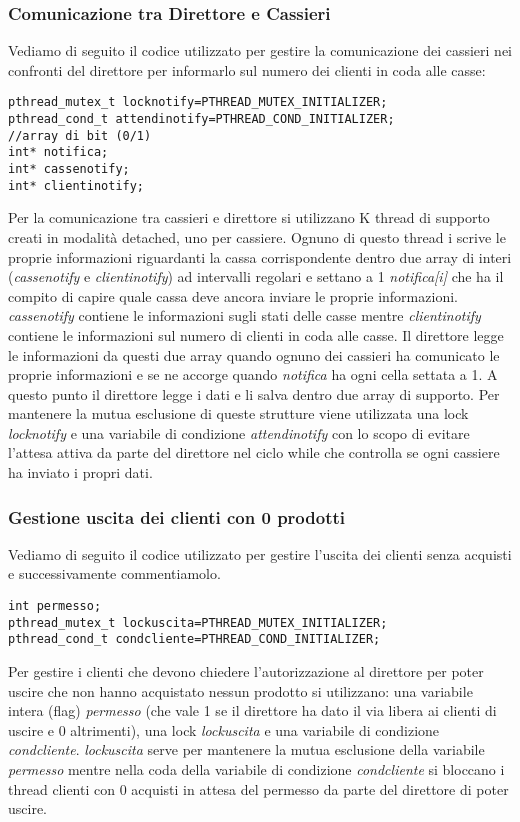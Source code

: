 \documentclass{article} %
\begin{document}
\subsubsection{Comunicazione tra Direttore e Cassieri}
Vediamo di seguito il codice utilizzato per gestire la comunicazione dei cassieri nei confronti del direttore per informarlo sul numero dei clienti in coda alle casse:
\begin{lstlisting}
pthread_mutex_t locknotify=PTHREAD_MUTEX_INITIALIZER;
pthread_cond_t attendinotify=PTHREAD_COND_INITIALIZER; 
//array di bit (0/1)
int* notifica;  
int* cassenotify; 
int* clientinotify; 
\end{lstlisting}
Per la comunicazione tra cassieri e direttore si utilizzano K thread di supporto creati in modalità detached, uno per cassiere. Ognuno di questo thread i scrive le proprie informazioni riguardanti la cassa corrispondente dentro due array di interi ({\itshape cassenotify} e {\itshape clientinotify}) ad intervalli regolari e settano a 1 {\itshape notifica[i]} che ha il compito di capire quale cassa deve ancora inviare le proprie informazioni. {\itshape cassenotify} contiene le informazioni sugli stati delle casse mentre {\itshape clientinotify} contiene le informazioni sul numero di clienti in coda alle casse. Il direttore legge le informazioni da questi due array quando ognuno dei cassieri ha comunicato le proprie informazioni e se ne accorge quando {\itshape notifica} ha ogni cella settata a 1. A questo punto il direttore legge i dati e li salva dentro due array di supporto. Per mantenere la mutua esclusione di queste strutture viene utilizzata una lock {\itshape locknotify} e una variabile di condizione {\itshape attendinotify} con lo scopo di evitare l’attesa attiva da parte del direttore nel ciclo while che controlla se ogni cassiere ha inviato i propri dati. 
\subsubsection{Gestione uscita dei clienti con 0 prodotti}
Vediamo di seguito il codice utilizzato per gestire l'uscita dei clienti senza acquisti e successivamente commentiamolo.
\begin{lstlisting}
int permesso; 
pthread_mutex_t lockuscita=PTHREAD_MUTEX_INITIALIZER; 
pthread_cond_t condcliente=PTHREAD_COND_INITIALIZER; 
\end{lstlisting}
Per gestire i clienti che devono chiedere l’autorizzazione al direttore per poter uscire che non hanno acquistato nessun prodotto si utilizzano: una variabile intera (flag) {\itshape permesso} (che vale 1 se il direttore ha dato il via libera ai clienti di uscire e 0 altrimenti), una lock {\itshape lockuscita} e una variabile di condizione {\itshape condcliente}. {\itshape lockuscita} serve per mantenere la mutua esclusione della variabile {\itshape permesso} mentre nella coda della variabile di condizione {\itshape condcliente} si bloccano i thread clienti con 0 acquisti in attesa del permesso da parte del direttore di poter uscire. 
\end{document}

